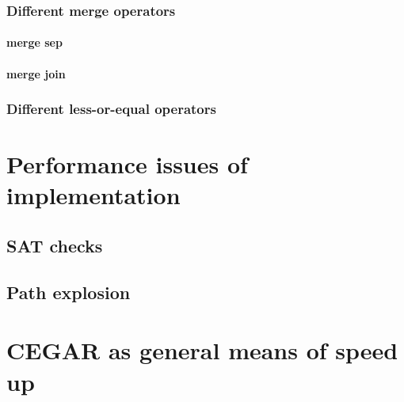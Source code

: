 \documentclass[a4paper,11pt]{article}
\begin{document}
\subsubsection{Different merge operators}
\paragraph{merge sep}
\paragraph{merge join}
\subsubsection{Different less-or-equal operators}

\section{Performance issues of implementation}
\subsection{SAT checks}
\subsection{Path explosion}

\section{CEGAR as general means of speed up}
\end{document}
